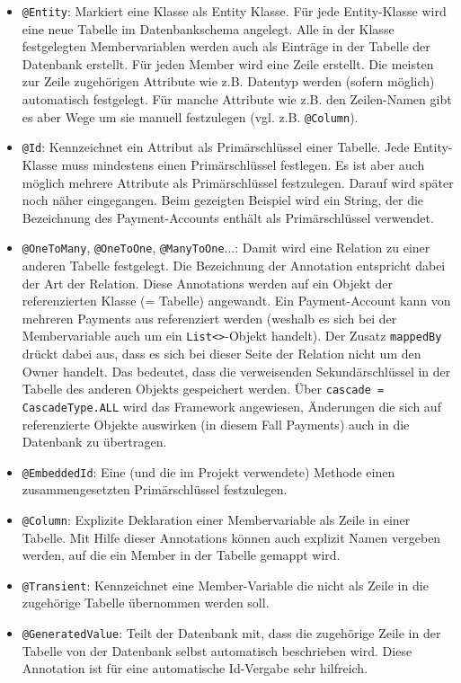 \begin{itemize}
	\item \verb|@Entity|: Markiert eine Klasse als Entity Klasse. Für jede Entity-Klasse wird eine neue Tabelle im Datenbankschema angelegt. Alle in der Klasse festgelegten Membervariablen werden auch als Einträge in der Tabelle der Datenbank erstellt. Für jeden Member wird eine Zeile erstellt. Die meisten zur Zeile zugehörigen Attribute wie z.B. Datentyp werden (sofern möglich) automatisch festgelegt. Für manche Attribute wie z.B. den Zeilen-Namen gibt es aber Wege um sie manuell festzulegen (vgl. z.B. \verb|@Column|).
	\item \verb|@Id|: Kennzeichnet ein Attribut als Primärschlüssel einer Tabelle. Jede Entity-Klasse muss mindestens einen Primärschlüssel festlegen. Es ist aber auch möglich mehrere Attribute als Primärschlüssel festzulegen. Darauf wird später noch näher eingegangen. Beim gezeigten Beispiel wird ein String, der die Bezeichnung des Payment-Accounts enthält als Primärschlüssel verwendet.
	\item \verb|@OneToMany|, \verb|@OneToOne|, \verb|@ManyToOne|...: Damit wird eine Relation zu einer anderen Tabelle festgelegt. Die Bezeichnung der Annotation entspricht dabei der Art der Relation. Diese Annotations werden auf ein Objekt der referenzierten Klasse (= Tabelle) angewandt. Ein Payment-Account kann von mehreren Payments aus referenziert werden (weshalb es sich bei der Membervariable auch um ein \verb|List<>|-Objekt handelt). Der Zusatz \verb|mappedBy| drückt dabei aus, dass es sich bei dieser Seite der Relation nicht um den Owner handelt. Das bedeutet, dass die verweisenden Sekundärschlüssel in der Tabelle des anderen Objekts gespeichert werden. Über \verb|cascade = CascadeType.ALL| wird das Framework angewiesen, Änderungen die sich auf referenzierte Objekte auswirken (in diesem Fall Payments) auch in die Datenbank zu übertragen.
	\item \verb|@EmbeddedId|: Eine (und die im Projekt verwendete) Methode einen zusammengesetzten Primärschlüssel festzulegen.
	\item \verb|@Column|: Explizite Deklaration einer Membervariable als Zeile in einer Tabelle. Mit Hilfe dieser Annotations können auch explizit Namen vergeben werden, auf die ein Member in der Tabelle gemappt wird.
	\item \verb|@Transient|: Kennzeichnet eine Member-Variable die nicht als Zeile in die zugehörige Tabelle übernommen werden soll.
	\item \verb|@GeneratedValue|: Teilt der Datenbank mit, dass die zugehörige Zeile in der Tabelle von der Datenbank selbst automatisch beschrieben wird. Diese Annotation ist für eine automatische Id-Vergabe sehr hilfreich.
\end{itemize}

